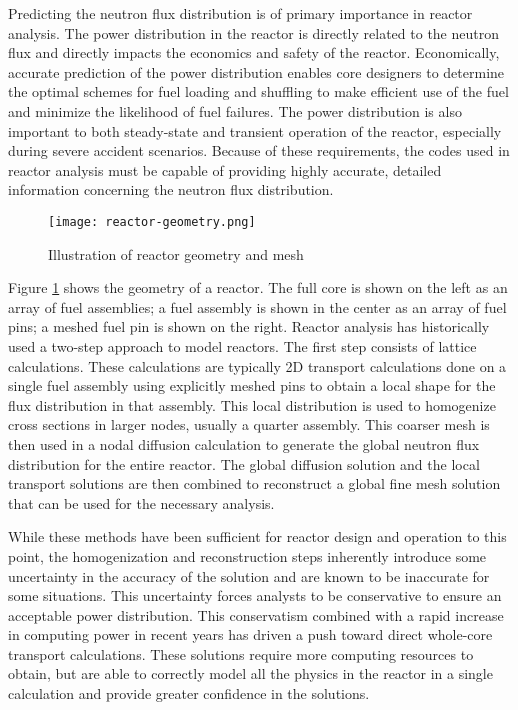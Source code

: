 Predicting the neutron flux distribution is of primary importance in reactor analysis.  The power distribution in the reactor is directly related to the neutron flux and directly impacts the economics and safety of the reactor.  Economically, accurate prediction of the power distribution enables core designers to determine the optimal schemes for fuel loading and shuffling to make efficient use of the fuel and minimize the likelihood of fuel failures.  The power distribution is also important to both steady-state and transient operation of the reactor, especially during severe accident scenarios.  Because of these requirements, the codes used in reactor analysis must be capable of providing highly accurate, detailed information concerning the neutron flux distribution.

\begin{figure}[h]
    \centering
    \texttt{[image: reactor-geometry.png]}
    \caption{Illustration of reactor geometry and mesh}\label{f:reactor-geometry}
\end{figure}

Figure \ref{f:reactor-geometry} shows the geometry of a reactor.  The full core is shown on the left as an array of fuel assemblies; a fuel assembly is shown in the center as an array of fuel pins; a meshed fuel pin is shown on the right.  Reactor analysis has historically used a two-step approach to model reactors.  The first step consists of lattice calculations.  These calculations are typically 2D transport calculations done on a single fuel assembly using explicitly meshed pins to obtain a local shape for the flux distribution in that assembly.  This local distribution is used to homogenize cross sections in larger nodes, usually a quarter assembly.  This coarser mesh is then used in a nodal diffusion calculation to generate the global neutron flux distribution for the entire reactor.  The global diffusion solution and the local transport solutions are then combined to reconstruct a global fine mesh solution that can be used for the necessary analysis.

While these methods have been sufficient for reactor design and operation to this point, the homogenization and reconstruction steps inherently introduce some uncertainty in the accuracy of the solution and are known to be inaccurate for some situations.  This uncertainty forces analysts to be conservative to ensure an acceptable power distribution.  This conservatism combined with a rapid increase in computing power in recent years has driven a push toward direct whole-core transport calculations.  These solutions require more computing resources to obtain, but are able to correctly model all the physics in the reactor in a single calculation and provide greater confidence in the solutions.

